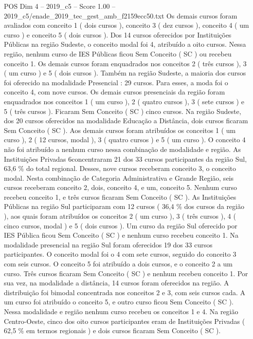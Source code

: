 \begin{textsample}{POS Dim 4 – 2019\_c5 – Score 1.00 – 2019\_c5/enade\_2019\_tec\_gest\_amb\_f2159ecc50.txt}
Os demais cursos foram avaliados com conceito 1 ( dois cursos ), conceito 3 ( dez cursos ), conceito 4 ( um curso ) e conceito 5 ( dois cursos ).
Dos 14 cursos oferecidos por Instituições Públicas na região Sudeste, o conceito modal foi 4, atribuído a oito cursos.
Nessa região, nenhum curso de IES Públicas ficou Sem Conceito ( SC ) ou recebeu conceito 1.
Os demais cursos foram enquadrados nos conceitos 2 ( três cursos ), 3 ( um curso ) e 5 ( dois cursos ).
Também na região Sudeste, a maioria dos cursos foi oferecido na modalidade Presencial : 29 cursos.
Para esses, a moda foi o conceito 4, com nove cursos.
Os demais cursos presenciais da região foram enquadrados nos conceitos 1 ( um curso ), 2 ( quatro cursos ), 3 ( sete cursos ) e 5 ( três cursos ).
Ficaram Sem Conceito ( SC ) cinco cursos.
Na região Sudeste, dos 20 cursos oferecidos na modalidade Educação a Distância, dois cursos ficaram Sem Conceito ( SC ).
Aos demais cursos foram atribuídos os conceitos 1 ( um curso ), 2 ( 12 cursos, modal ), 3 ( quatro cursos ) e 5 ( um curso ).
O conceito 4 não foi atribuído a nenhum curso nessa combinação de modalidade e região.
As Instituições Privadas 6concentraram 21 dos 33 cursos participantes da região Sul, 63,6 \% do total regional.
Desses, nove cursos receberam conceito 3, o conceito modal.
Nesta combinação de Categoria Administrativa e Grande Região, seis cursos receberam conceito 2, dois, conceito 4, e um, conceito 5.
Nenhum curso recebeu conceito 1, e três cursos ficaram Sem Conceito ( SC ).
As Instituições Públicas na região Sul participaram com 12 cursos ( 36,4 \% dos cursos da região ), aos quais foram atribuídos os conceitos 2 ( um curso ), 3 ( três cursos ), 4 ( cinco cursos, modal ) e 5 ( dois cursos ).
Um curso da região Sul oferecido por IES Pública ficou Sem Conceito ( SC ) e nenhum curso recebeu conceito 1.
Na modalidade presencial na região Sul foram oferecidos 19 dos 33 cursos participantes.
O conceito modal foi o 4 com sete cursos, seguido do conceito 3 com seis cursos.
O conceito 5 foi atribuído a dois cursos, e o conceito 2 a um curso.
Três cursos ficaram Sem Conceito ( SC ) e nenhum recebeu conceito 1.
Por sua vez, na modalidade a distância, 14 cursos foram oferecidos na região.
A distribuição foi bimodal concentrada nos conceitos 2 e 3, com seis cursos cada.
A um curso foi atribuído o conceito 5, e outro curso ficou Sem Conceito ( SC ).
Nessa modalidade e região nenhum curso recebeu os conceitos 1 e 4.
Na região Centro-Oeste, cinco dos oito cursos participantes eram de Instituições Privadas ( 62,5 \% em termos regionais ) e dois cursos ficaram Sem Conceito ( SC ).

\end{textsample}
